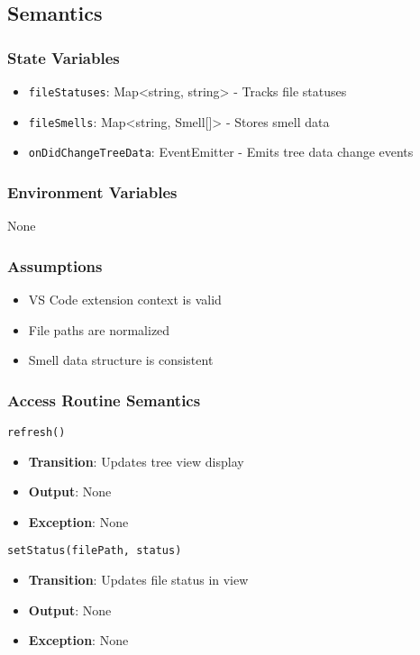 \documentclass[12pt, titlepage]{article}
\begin{document}
\subsection{Semantics}

\subsubsection{State Variables}
\begin{itemize}
\item \texttt{fileStatuses}: Map<string, string> - Tracks file statuses
\item \texttt{fileSmells}: Map<string, Smell[]> - Stores smell data
\item \texttt{onDidChangeTreeData}: EventEmitter - Emits tree data change events
\end{itemize}

\subsubsection{Environment Variables}
None

\subsubsection{Assumptions}
\begin{itemize}
\item VS Code extension context is valid
\item File paths are normalized
\item Smell data structure is consistent
\end{itemize}

\subsubsection{Access Routine Semantics}
\texttt{refresh()}
\begin{itemize}
\item \textbf{Transition}: Updates tree view display
\item \textbf{Output}: None
\item \textbf{Exception}: None
\end{itemize}

\texttt{setStatus(filePath, status)}
\begin{itemize}
\item \textbf{Transition}: Updates file status in view
\item \textbf{Output}: None
\item \textbf{Exception}: None
\end{itemize}
\end{document}
